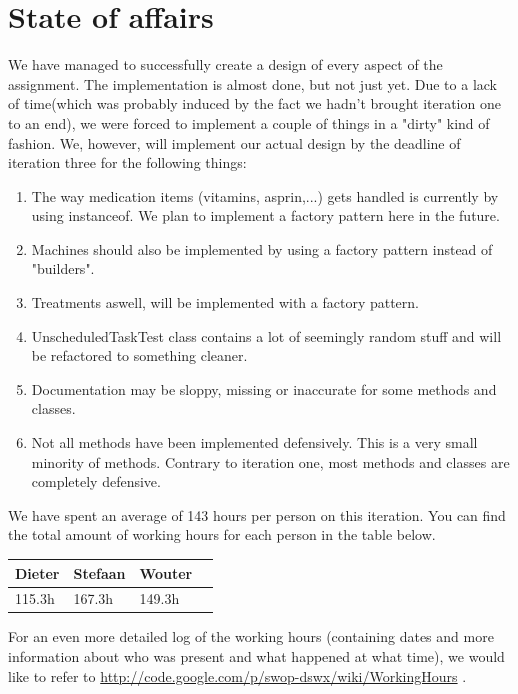 \documentclass[11pt]{article}
\begin{document}
\section{State of affairs}
We have managed to successfully create a design of every aspect of the assignment. The implementation is almost done, but not just yet. Due to a lack of time(which was probably induced by the fact we hadn't brought iteration one to an end), we were forced to implement a couple of things in a "dirty" kind of fashion. We, however, will implement our actual design by the deadline of iteration three for the following things:
\begin{enumerate}
\item{The way medication items (vitamins, asprin,...) gets handled is currently by using instanceof. We plan to implement a factory pattern here in the future.}
\item{Machines should also be implemented by using a factory pattern instead of "builders".}
\item{Treatments aswell, will be implemented with a factory pattern.}
\item{UnscheduledTaskTest class contains a lot of seemingly random stuff and will be refactored to something cleaner.}
\item{Documentation may be sloppy, missing or inaccurate for some methods and classes.}
\item{Not all methods have been implemented defensively. This is a very small minority of methods. Contrary to iteration one, most methods and classes are completely defensive.}
\end{enumerate}

We have spent an average of 143 hours per person on this iteration. You can find the total amount of working hours for each person in the table below.
\begin{center}
    \begin{tabular}{ | l | l | l | p{100mm} |}
    \hline
    Dieter & Stefaan & Wouter\\ \hline
    115.3h & 167.3h & 149.3h\\
    \hline
    \end{tabular}
\end{center}
For an even more detailed log of the working hours (containing dates and more information about who was present and what happened at what time), we would like to refer to \url{http://code.google.com/p/swop-dswx/wiki/WorkingHours} .
\end{document}
